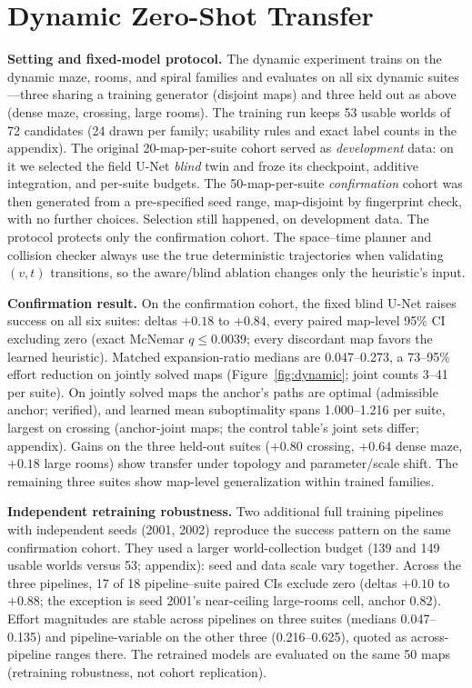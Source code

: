 \documentclass[letterpaper]{article} %
\begin{document}
\section{Dynamic Zero-Shot Transfer}

\textbf{Setting and fixed-model protocol.} The dynamic experiment trains on the dynamic maze, rooms, and spiral families and evaluates on all six dynamic suites---three sharing a training generator (disjoint maps) and three held out as above (dense maze, crossing, large rooms). The training run keeps 53 usable worlds of 72 candidates (24 drawn per family; usability rules and exact label counts in the appendix). The original 20-map-per-suite cohort served as \emph{development} data: on it we selected the field U-Net \emph{blind} twin and froze its checkpoint, additive integration, and per-suite budgets. The 50-map-per-suite \emph{confirmation} cohort was then generated from a pre-specified seed range, map-disjoint by fingerprint check, with no further choices. Selection still happened, on development data. The protocol protects only the confirmation cohort. The space--time planner and collision checker always use the true deterministic trajectories when validating $(v,t)$ transitions, so the aware/blind ablation changes only the heuristic's input.

\textbf{Confirmation result.} On the confirmation cohort, the fixed blind U-Net raises success on all six suites: deltas $+0.18$ to $+0.84$, every paired map-level 95\% CI excluding zero (exact McNemar $q \leq 0.0039$; every discordant map favors the learned heuristic). Matched expansion-ratio medians are 0.047--0.273, a 73--95\% effort reduction on jointly solved maps (Figure~\ref{fig:dynamic}; joint counts 3--41 per suite). On jointly solved maps the anchor's paths are optimal (admissible anchor; verified), and learned mean suboptimality spans 1.000--1.216 per suite, largest on crossing (anchor-joint maps; the control table's joint sets differ; appendix). Gains on the three held-out suites ($+0.80$ crossing, $+0.64$ dense maze, $+0.18$ large rooms) show transfer under topology and parameter/scale shift. The remaining three suites show map-level generalization within trained families.

\textbf{Independent retraining robustness.} Two additional full training pipelines with independent seeds (2001, 2002) reproduce the success pattern on the same confirmation cohort. They used a larger world-collection budget (139 and 149 usable worlds versus 53; appendix): seed and data scale vary together. Across the three pipelines, 17 of 18 pipeline--suite paired CIs exclude zero (deltas $+0.10$ to $+0.88$; the exception is seed 2001's near-ceiling large-rooms cell, anchor 0.82). Effort magnitudes are stable across pipelines on three suites (medians 0.047--0.135) and pipeline-variable on the other three (0.216--0.625), quoted as across-pipeline ranges there. The retrained models are evaluated on the same 50 maps (retraining robustness, not cohort replication).
\end{document}
